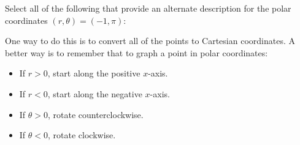 \documentclass{ximera}
\author{Jim Talamo }
\begin{document}
\begin{exercise}

Select all of the following that provide an alternate description for the polar coordinates $(r, \theta) = (-1,\pi)$:

\begin{selectAll}
\end{selectAll}

\begin{hint}
One way to do this is to convert all of the points to Cartesian coordinates.  A better way is to remember that to graph a point in polar coordinates:

\begin{itemize}
\item If $r>0$, start along the positive $x$-axis.
\item If $r<0$, start along the negative $x$-axis.
\item If $\theta>0$, rotate counterclockwise.
\item If $\theta<0$, rotate clockwise.
\end{itemize}
\end{hint}
\end{exercise}
\end{document}
